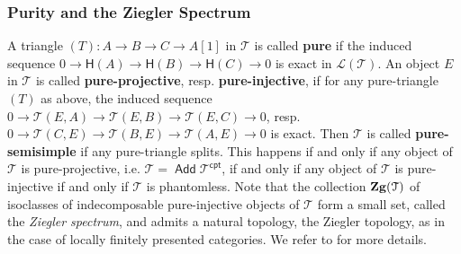\documentclass[oneside, a4paper,reqno]{amsart}
\numberwithin{equation}{section}
\theoremstyle{definition}
\begin{document}
\subsubsection{Purity and the Ziegler Spectrum}
A triangle $(T):  A {\longrightarrow} B {\longrightarrow} C {\longrightarrow} A[1]$ in  ${\mathcal T}$ is called {\bf
pure} if the induced sequence $0{\longrightarrow}\mathsf{H}(A) {\longrightarrow} \mathsf{H}(B)
{\longrightarrow} \mathsf{H}(C) {\longrightarrow} 0$ is exact in $\mathcal L({\mathcal T})$. An object
$E$ in ${\mathcal T}$ is called {\bf pure-projective}, resp. {\bf
pure-injective}, if for any pure-triangle $(T)$ as above, the
induced sequence $0 {\longrightarrow} {\mathcal T}(E,A){\longrightarrow} {\mathcal T}(E,B) {\longrightarrow} {\mathcal T}(E,C) {\longrightarrow} 0$,
resp. $0 {\longrightarrow} {\mathcal T}(C,E){\longrightarrow} {\mathcal T}(B,E) {\longrightarrow} {\mathcal T}(A,E) {\longrightarrow} 0$ is exact.
Then ${\mathcal T}$ is called {\bf pure-semisimple} if any pure-triangle
splits. This happens if and only if any object of ${\mathcal T}$ is
pure-projective, i.e. ${\mathcal T} = \operatorname*{\mathsf{Add}}{\mathcal T}^{\mathsf{cpt}}$, if and only if any
object of ${\mathcal T}$ is pure-injective if and only if ${\mathcal T}$ is phantomless.
Note that the collection ${\bf Zg}({\mathcal T})$ of isoclasses of
indecomposable pure-injective objects of ${\mathcal T}$ form a small set,
called the {\em Ziegler spectrum}, and admits a natural topology,
the  Ziegler topology, as in the case of locally finitely presented
categories. We refer to \cite{B:art} for more details.

\medskip
\end{document}
